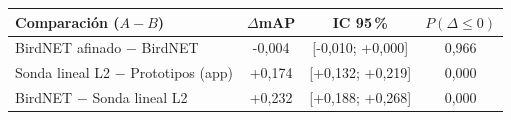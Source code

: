\begin{tabular}{lccc}
\toprule
Comparación ($A - B$) & $\Delta$mAP & IC 95\,\% & $P(\Delta\leq 0)$\\
\midrule
BirdNET afinado $-$ BirdNET & -0{,}004 & [-0{,}010; +0{,}000] & 0{,}966\\
Sonda lineal L2 $-$ Prototipos (app) & +0{,}174 & [+0{,}132; +0{,}219] & 0{,}000\\
BirdNET $-$ Sonda lineal L2 & +0{,}232 & [+0{,}188; +0{,}268] & 0{,}000\\
\bottomrule
\end{tabular}
